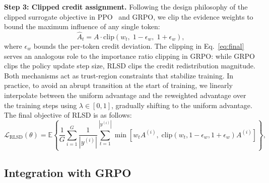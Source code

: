 \documentclass[]{jingdong}
\begin{document}
 
\noindent \textbf{Step 3: Clipped credit assignment.}
Following the design philosophy of the clipped surrogate objective in PPO~\citep{schulman2017proximalpolicyoptimizationalgorithmsppo} and GRPO, we clip the evidence weights to bound the maximum influence of any single token:
\begin{equation}
    \hat{A}_t = A \cdot \mathrm{clip}\!\left(w_t,\; 1 - \epsilon_w,\; 1 + \epsilon_w\right),
    \label{eq:final}
\end{equation}
where $\epsilon_w$ bounds the per-token credit deviation. The clipping in Eq.~\eqref{eq:final} serves an analogous role to the importance ratio clipping in GRPO: while GRPO clips the policy update step size, RLSD clips the credit redistribution magnitude. Both mechanisms act as trust-region constraints that stabilize training.  In practice, to avoid an abrupt transition at the start of training, we linearly interpolate between the uniform advantage and the reweighted advantage over the training steps using $\lambda \in [0, 1]$, gradually shifting to the uniform advantage. The final objective of RLSD is as follows:
\begin{equation}
    \mathcal{L}_{\text{RLSD}}(\theta) = \mathbb{E}\left\{\frac{1}{G}\sum_{i=1}^{G}\frac{1}{|y^{(i)}|}\sum_{t=1}^{|y^{(i)}|} \min\! \left[ w_tA^{(i)} ,\; \text{clip}\!\left(w_t, 1-\epsilon_w, 1+\epsilon_w\right)A^{(i)} \right]\right\},
    \label{eq:rlsd}
\end{equation}


\subsection{Integration with GRPO}
\label{sec:integration}
 
\end{document}
